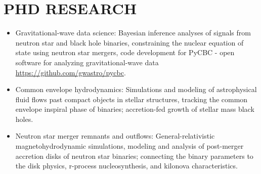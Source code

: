 \vspace{0.9mm}
{}
\vspace{1mm}

\section{PHD RESEARCH}
\begin{itemize}
\renewcommand{\labelitemi}{$\bullet$}
    \item Gravitational-wave data science: Bayesian inference analyses of signals from neutron star and black hole binaries, constraining the nuclear equation of state using neutron star mergers, code development for PyCBC - open software for analyzing gravitational-wave data \url{https://github.com/gwastro/pycbc}.
    \item Common envelope hydrodynamics: Simulations and modeling of astrophysical fluid flows past compact objects in stellar structures, tracking the common envelope inspiral phase of binaries; accretion-fed growth of stellar mass black holes.
    \item Neutron star merger remnants and outflows: General-relativistic magnetohydrodynamic simulations, modeling and analysis of post-merger accretion disks of neutron star binaries; connecting the binary parameters to the disk physics, r-process nucleosynthesis, and kilonova characteristics.
\end{itemize}
\vspace{0.05mm}

\iffalse
